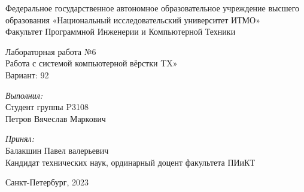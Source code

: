 
\begin{center}
\large Федеральное государственное автономное образовательное учреждение высшего образования «Национальный исследовательский университет ИТМО»\\
Факультет Программной Инженерии и Компьютерной Техники\\
\hfill 


\vspace{5.5cm}
\Large Лабораторная работа №6 \\
Работа с системой компьютерной вёрстки T\raisebox{-0.3em}{E}X»\\
Вариант: 92\\
\end{center}

\vspace{2.5cm}
 
\begin{flushright}
\textit{Выполнил:}\\
Студент группы P3108\\
Петров Вячеслав Маркович\

\textit{Принял:}\\
Балакшин Павел валерьевич\\
Кандидат технических наук, ординарный доцент факультета ПИиКТ\\
\end{flushright}
 
\vfill

\begin{center} Санкт-Петербург, 2023 \end{center}

\thispagestyle{empty}
\newpage

